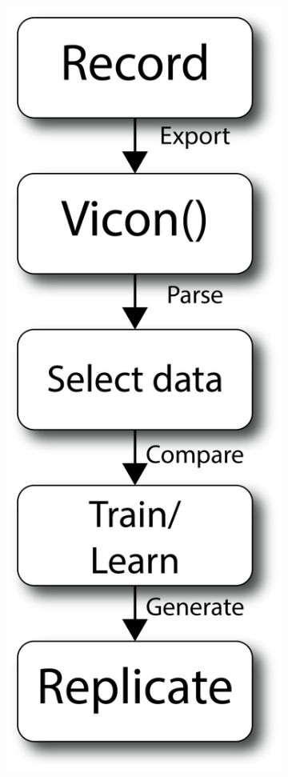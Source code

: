 \begin{figure}[h!]
    \begin{subfigure}{0.4\linewidth} 
        \centering
        \captionsetup{justification=centering}
        \centerline{
        \includegraphics[scale=0.25]{images/software/software_layers.png}}

\end{subfigure}
\end{figure}
